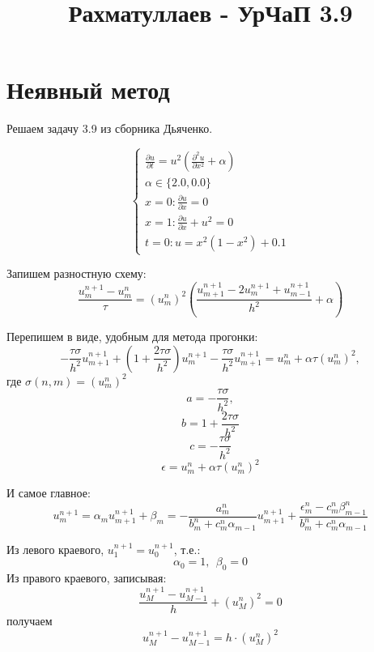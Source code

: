 \documentclass[11pt]{article}
\title{Рахматуллаев - УрЧаП 3.9}
\begin{document}
    
    \maketitle
    
    

    
    \hypertarget{ux43dux435ux44fux432ux43dux44bux439-ux43cux435ux442ux43eux434}{%
\section{Неявный
метод}\label{ux43dux435ux44fux432ux43dux44bux439-ux43cux435ux442ux43eux434}}

    Решаем задачу 3.9 из сборника Дьяченко.

\begin{equation}
\left\{\begin{array}{l}
\frac{\partial u}{\partial t}=u^{2}\left(\frac{\partial^{2} u}{\partial x^{2}}+\alpha\right) \\
\alpha \in\{2.0,0.0\} \\
x=0: \frac{\partial u}{\partial x}=0 \\
x=1: \frac{\partial u}{\partial x}+u^{2}=0 \\
t=0: u=x^{2}\left(1-x^{2}\right)+0.1
\end{array}\right.
\end{equation}

    Запишем разностную схему:
\[\frac{u^{n+1}_{m} - u^{n}_{m}}{\tau} = ({u}^{n}_{m})^2 \left( \frac{u^{n+1}_{m+1} - 2u^{n+1}_{m} + u^{n+1}_{m-1}}{h^2} + \alpha \right)\]

Перепишем в виде, удобным для метода прогонки:
\[-\frac{\tau \sigma}{h^2} u^{n+1}_{m+1} + \left( 1+ \frac{2\tau \sigma}{h^2}  \right)u^{n+1}_{m} -\frac{\tau \sigma}{h^2} u^{n+1}_{m+1} = u^{n}_{m} + \alpha \tau (u^{n}_m)^2 ,\]
где \(\sigma(n, m) = (u^{n}_{m})^2\) \[a = -\frac{\tau \sigma}{h^2}, \]
\[b =  1+ \frac{2\tau \sigma}{h^2} \] \[c = -\frac{\tau \sigma}{h^2}\]
\[\epsilon = u_m^n + \alpha \tau (u^{n}_m)^2\]

И самое главное:
\[u^{n+1}_{m} = \alpha_m u^{n+1}_{m+1} + \beta_m = -\frac{a^n_m}{b^n_m + c^n_m \alpha_{m-1}} u^{n+1}_{m+1} + \frac{\epsilon_m^n - c_m^n \beta_{m-1}^n}{b^n_m + c^n_m \alpha_{m-1}} \]

    Из левого краевого, \(u_1^{n+1} = u_0^{n+1}\), т.е.:
\[\alpha_0 = 1, \ \ \beta_0=0\] Из правого краевого, записывая:
\[\frac{u_M^{n+1} - u_{M-1}^{n+1}}{h} + (u_M^n)^2 = 0\] получаем
\[ u_M^{n+1} - u_{M-1}^{n+1} = h \cdot (u_M^n)^2\]
\end{document}
